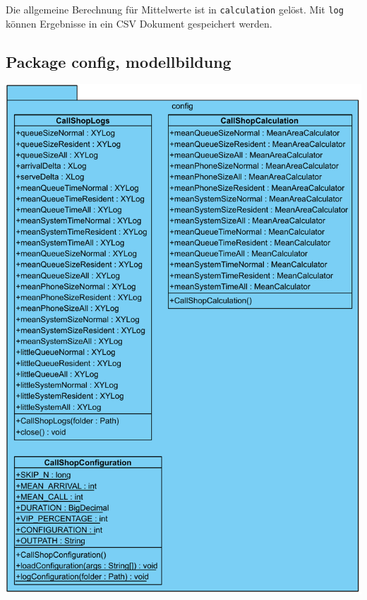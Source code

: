Die allgemeine Berechnung für Mittelwerte ist in \texttt{calculation} gelöst.
Mit \texttt{log} können Ergebnisse in ein CSV Dokument gespeichert werden.

\subsection{Package config, modellbildung}

\includegraphics[scale=0.3]{abbildungen/uml/config.pdf}

